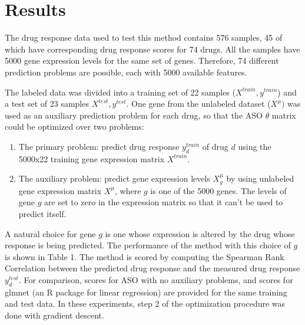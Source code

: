 \documentclass{article}
\begin{document}
\section{Results}
The drug response data used to test this method contains 576 samples, 45 of which have
corresponding drug response scores for 74 drugs. All the samples have 5000 gene expression 
levels for the same set of genes. Therefore, 74 different prediction problems are
possible, each with 5000 available features.
\par
The labeled data was divided into a training set of 22
samples ($X^{train}, y^{train}$) and a test set of 23 samples $X^{test}, y^{test}$. One gene from the unlabeled dataset ($X^{\mu})$ was 
used as an auxiliary prediction problem for each drug, so that the ASO $\theta$ matrix
could be optimized over two problems:
\begin{enumerate}
\item The primary problem: predict drug response $y_d^{train}$ of drug $d$ using the 5000x22 training gene
expression matrix $X^{train}$.
\item The auxiliary problem: predict gene expression levels $X_{g}^{\mu}$ 
by using unlabeled gene expression matrix $X^{\mu}$, where
$g$ is one of the 5000 genes. The levels of gene $g$ are set to zero in the
expression matrix so that it can't be used to predict itself.
\end{enumerate}
A natural choice for gene $g$ is one whose expression is altered by the drug
whose response is being predicted. The performance of the method with this choice
of $g$ is shown in Table 1. The method is scored by computing the Spearman
Rank Correlation between the predicted drug response and the measured drug
response $y^{test}_d$. For comparison, scores for ASO with no auxiliary problems, and
scores for glmnet (an R package for linear regression) are provided for the same
training and test data. In these experiments, step 2 of the optimization procedure
was done with gradient descent.
\end{document}
